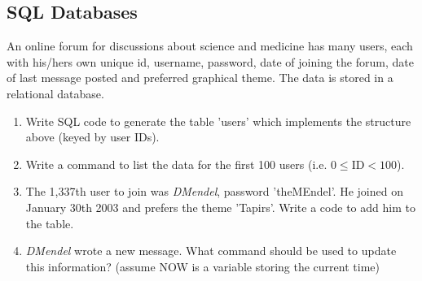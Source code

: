     
\subsection{SQL Databases}
An online forum for discussions about science and medicine has many users, each with his/hers own unique id, username, password, date of joining the forum, date of last message posted and preferred graphical theme.
The data is stored in a relational database.
    \begin{enumerate}
      \item Write SQL code to generate the table 'users' which implements the structure above (keyed by user IDs).
        \if{}\fi
      
      \item Write a command to list the data for the first 100 users (i.e. $0\leq\text{ID}<100$).
        \if{}\fi
      
      \item The 1,337th user to join was \textit{DMendel}, password 'theMEndel'. He joined on January 30th 2003 and prefers the theme 'Tapirs'. Write a code to add him to the table.
        \if{}\fi
      
      \item \textit{DMendel} wrote a new message. What command should be used to update this information? (assume NOW is a variable storing the current time)
        \if{}\fi
      

\end{enumerate}
